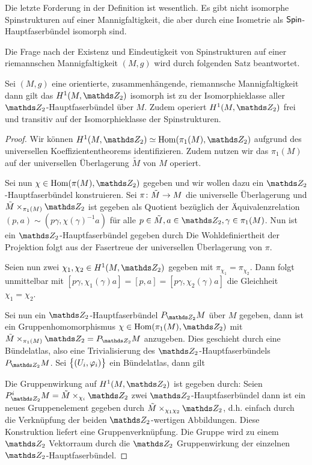 Die letzte Forderung in der Definition ist wesentlich. Es gibt nicht isomorphe
Spinstrukturen auf einer Mannigfaltigkeit, die aber durch eine Isometrie
als $ \operatorname{\mathsf{Spin}} $-Hauptfaserbündel isomorph sind.

Die Frage nach der Existenz und Eindeutigkeit von Spinstrukturen 
auf einer riemannschen Mannigfaltigkeit $ (M,g) $ wird durch folgenden
Satz beantwortet.

\begin{Satz}\label{anzahlspin}
	Sei $ (M,g) $ eine orientierte, zusammenhängende, riemannsche Mannigfaltigkeit dann
	gilt das $ H^1(M,\Z_2) $ isomorph ist zu der Isomorphieklasse aller $ \Z_2 $-Hauptfaserbündel über $ M $. Zudem operiert $ H^1(M,\Z_2) $ frei
	und transitiv auf der Isomorphieklasse der Spinstrukturen.
	\begin{proof}
		Wir können $ H^1(M,\Z_2)\simeq \Hom(\pi_1(M),\Z_2) $ aufgrund des universellen
		Koeffiziententheorems identifizieren. Zudem nutzen wir das $ \pi_1(M) $
		auf der universellen Überlagerung $ \tilde{M} $ von $ M $ operiert.
		
		Sei nun $ \chi\in\Hom(\pi(M),\Z_2) $ gegeben und wir wollen dazu
		ein $ \Z_2 $-Hauptfaserbündel konstruieren. Sei $ \pi \colon \tilde{M} \rightarrow M $ die universelle Überlagerung
		und $ \tilde{M}\times_{\pi_1(M)}\Z_2 $ ist gegeben als
		Quotient bezüglich der Äquivalenzrelation  $ (p,a) \sim (p\gamma,\chi(\gamma)^{-1}a) $ für alle $ p\in\tilde{M},a\in\Z_2,\gamma\in\pi_1(M) $.
		Nun ist ein $ \Z_2 $-Hauptfaserbündel gegeben durch
		Die Wohldefiniertheit der Projektion folgt aus der Fasertreue
		der universellen Überlagerung von $ \pi $.
		
		Seien nun zwei $ \chi_1,\chi_2\in H^1(M,\Z_2) $ gegeben mit $ \pi_{\chi_1}=\pi_{\chi_2} $. Dann folgt unmittelbar mit $ [p\gamma,\chi_1(\gamma)a] = [p,a] = [p\gamma,\chi_2(\gamma)a] $
		die Gleichheit $ \chi_1=\chi_2 $.
		
		Sei nun ein $ \Z_2 $-Hauptfaserbündel $ \Ph{\Z_2}{M} $ über $ M $
		gegeben, dann ist ein Gruppenhomomorphismus $ \chi\in\Hom(\pi_1(M),\Z_2) $ mit $ \tilde{M}\times_{\pi_1(M)} \Z_2 = \Ph{\Z_2}{M}$ anzugeben. Dies geschieht durch
		eine Bündelatlas, also eine Trivialisierung des $ \Z_2 $-Hauptfaserbündels $ \Ph{\Z_2}{M} $. Sei $ \bigl\{  (U_i,\varphi_i) \bigr\}$ ein Bündelatlas, dann gilt
		
		
		Die Gruppenwirkung auf $ H^1(M,\Z_2) $ ist gegeben durch:
		Seien $ P^i_{\Z_2}M=\tilde{M} \times_{\chi_i} \Z_2 $ zwei $ \Z_2 $-Hauptfaserbündel dann ist ein neues Gruppenelement gegeben
		durch $ \tilde{M} \times_{\chi_1\chi_2} \Z_2 $, d.h.
		einfach durch die Verknüpfung der beiden $ \Z_2 $-wertigen
		Abbildungen. Diese Konstruktion liefert eine
		Gruppenverknüpfung. Die Gruppe wird zu einem $ \Z_2 $
		Vektorraum durch die $ \Z_2 $ Gruppenwirkung der einzelnen
		$ \Z_2 $-Hauptfaserbündel.
		

\end{proof}
\end{Satz}
